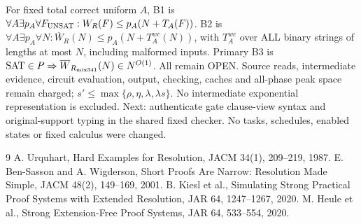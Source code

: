 \documentclass[11pt]{article}
\begin{document}
For fixed total correct uniform $A$, B1 is $\forall A\exists p_A\forall F_{\rm UNSAT}: W_R(F)\le p_A(N+T_A(F))$. B2 is $\forall A\exists p_A\forall N:\overline W_R(N)\le p_A(N+T_A^{wc}(N))$, with $T_A^{wc}$ over ALL binary strings of lengths at most $N$, including malformed inputs. Primary B3 is $\mathrm{SAT}\in P\Rightarrow\overline W_{R_{\rm mix341}}(N)\in N^{O(1)}$. All remain OPEN. Source reads, intermediate evidence, circuit evaluation, output, checking, caches and all-phase peak space remain charged; $s'\le\max\{\rho,\eta,\lambda,\lambda s\}$. No intermediate exponential representation is excluded. Next: authenticate gate clause-view syntax and original-support typing in the shared fixed checker. No tasks, schedules, enabled states or fixed calculus were changed.

\begin{thebibliography}{9}
 A. Urquhart, Hard Examples for Resolution, JACM 34(1), 209--219, 1987.
 E. Ben-Sasson and A. Wigderson, Short Proofs Are Narrow: Resolution Made Simple, JACM 48(2), 149--169, 2001.
 B. Kiesl et al., Simulating Strong Practical Proof Systems with Extended Resolution, JAR 64, 1247--1267, 2020.
 M. Heule et al., Strong Extension-Free Proof Systems, JAR 64, 533--554, 2020.
\end{thebibliography}
\end{document}
